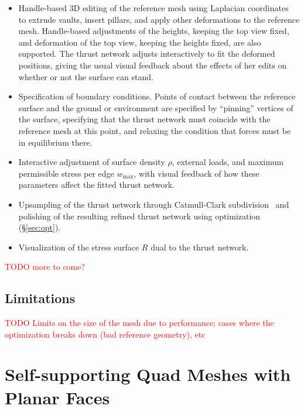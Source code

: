 \documentclass[annual]{acmsiggraph}
\newcommand{\todo}[1]{\textcolor{red}{#1}}
\newcommand{\secref}[1]{(\S\ref{#1})}
\begin{document}
\begin{itemize}

\item Handle-based 3D editing of the reference mesh using Laplacian 
coordinates~\cite{Lipman2004,Sorkine2003} to extrude vaults, insert 
pillars, and apply other deformations to the reference mesh. Handle-based 
adjustments of the heights, keeping the top view fixed, and deformation of 
the top view, keeping the heights fixed, are also supported. The thrust 
network adjusts interactively to fit the deformed positions, giving the 
usual visual feedback about the effects of her edits on whether or not the 
surface can stand.

\item Specification of boundary conditions. Points of contact between the 
reference surface and the ground or environment are specified by 
``pinning'' vertices of the surface, specifying that the thrust network 
must coincide with the reference mesh at this point, and relaxing the 
condition that forces must be in equilibrium there.

\item Interactive adjustment of surface density $\rho$, external loads, 
and maximum permissible stress per edge $w_{\textrm{max}}$, with visual 
feedback of how these parameters affect the fitted thrust network.

\item Upsampling of the thrust network through Catmull-Clark 
subdivision~\cite{TODO} and polishing of the resulting refined thrust 
network using optimization \secref{sec:opt}.

\item Visualization of the stress surface $R$ dual to the thrust network.

\end{itemize}

\todo{TODO more to come?}

\subsection{Limitations}

\todo{TODO Limits on the size of the mesh due to performance; cases where 
the optimization breaks down (bad reference geometry), etc}

\section{Self-supporting Quad Meshes with Planar Faces} \label{sec:pq}
\end{document}
